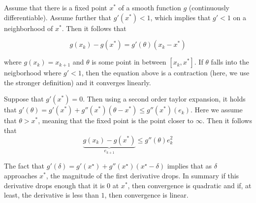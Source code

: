 \documentclass[../main.tex]{subfiles}
\begin{document}
    \begin{definition}
        Assume that there is a fixed point $x^{*}$ of a smooth function $g$ (continuously differentiable). Assume further that $g'(x^{*}) < 1$, which implies that $g' < 1$ on a neighborhood of $x^{*}$. Then it follows that

        \[
            g(x_{k}) - g(x^{*}) = g'(\theta)(x_{k} - x^{*})
        \]

    where $g(x_{k}) = x_{k+1}$ and $\theta$ is some point in between $[x_k, x^{*}]$. If $\theta$ falls into the neigborhood where $g' < 1$, then the equation above is a contraction (here, we use the stronger definition) and it converges linearly.
    \end{definition}

    \begin{remark}
        Suppose that $g'(x^{*}) = 0$. Then using a second order taylor expansion, it holds that $g'(\theta) = g'(x^{*}) + g''(x^{*})(\theta - x^{*}) \leq g''(x^{*})(e_k)$. Here we assume that $\theta > x^{*}$, meaning that the fixed point is the point closer to $\infty$. Then it follows that
        \[
            \underbrace{ g(x_{k}) - g(x^{*}) }_{e_{k+1}}\leq g''(\theta)e_k^2
        \]
    \end{remark}


    \begin{remark}
        The fact that $g'(\delta) = g'(x^{\star}) + g''(x^{\star})(x^{\star} - \delta)$ implies that as $\delta$ approaches $x^{*}$, the magnitude of the first derivative drops. In summary if this derivative drops enough that it is $0$ at $x^{*}$, then convergence is quadratic and if, at least, the derivative is less than $1$, then convergence is linear.
    \end{remark}
\end{document}
